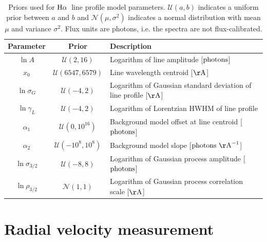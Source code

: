 \documentclass[modern, letterpaper]{aastex61}
\newcommand{\Ha}{\ensuremath{{\rm H}\alpha}}
\begin{document}
\begin{table}[ht]
  \begin{center}
    \begin{tabular}{ c | c | l }
      \toprule
        Parameter & Prior & Description \\\toprule
        $\ln A$ & $\mathcal{U}(2, 16)$ & Logarithm of line amplitude
          [${\rm photons}$]\\
        $x_0$ & $\mathcal{U}(6547, 6579)$ & Line wavelength centroid
          [${\rm \AA}$]\\
        $\ln\sigma_G$ & $\mathcal{U}(-4, 2)$ & Logarithm of Gaussian standard
          deviation of line profile [${\rm \AA}$]\\
        $\ln\gamma_L$ & $\mathcal{U}(-4, 2)$ & Logarithm of Lorentzian HWHM of
          line profile\\
        $\alpha_1$ & $\mathcal{U}(0, 10^{16})$ & Background model offset at line
          centroid [${\rm photons}$]\\
        $\alpha_2$ & $\mathcal{U}(-10^8, 10^8)$ & Background model slope
          [${\rm photons}~{\rm \AA}^{-1}$]\\
        $\ln\sigma_{3/2}$ & $\mathcal{U}(-8, 8)$ & Logarithm of Gaussian process
          amplitude [${\rm photons}$]\\
        $\ln\rho_{3/2}$ & $\mathcal{N}(1, 1)$ & Logarithm of Gaussian process
          correlation scale [${\rm \AA}$]\\
      \bottomrule
    \end{tabular}
    \caption{
      Priors used for \Ha\ line profile model parameters.
      $\mathcal{U}(a, b)$ indicates a uniform prior between $a$ and $b$ and
      $\mathcal{N}(\mu, \sigma^2)$ indicates a normal distribution with mean
      $\mu$ and variance $\sigma^2$.
      Flux units are photons, i.e. the spectra are not flux-calibrated.
      \label{tbl:prior-bounds}
    }
  \end{center}
\end{table}

\section{Radial velocity measurement} \label{sec:rv-meas}
\end{document}
